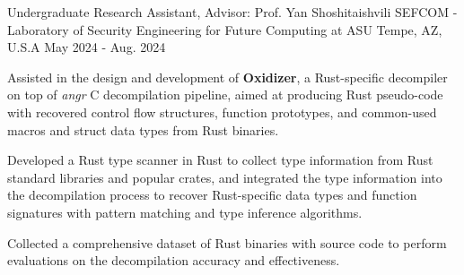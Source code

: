 \begin{cventries}
  \cventry
    {Undergraduate Research Assistant, Advisor: Prof. Yan Shoshitaishvili} %
    {SEFCOM - Laboratory of Security Engineering for Future Computing at ASU} %
    {Tempe, AZ, U.S.A} %
    {May 2024 - Aug. 2024} %
    {
      \begin{cvitems} %
        \item {Assisted in the design and development of \textbf{Oxidizer}, a Rust-specific decompiler on top of \textit{angr} C decompilation pipeline, aimed at producing Rust pseudo-code with recovered control flow structures, function prototypes, and common-used macros and struct data types from Rust binaries.}
        \item {Developed a Rust type scanner in Rust to collect type information from Rust standard libraries and popular crates, and integrated the type information into the decompilation process to recover Rust-specific data types and function signatures with pattern matching and type inference algorithms.}
        \item {Collected a comprehensive dataset of Rust binaries with source code to perform evaluations on the decompilation accuracy and effectiveness.}
      \end{cvitems}
    }


\end{cventries}
